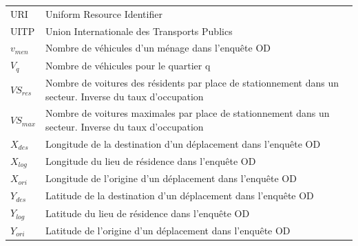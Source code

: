 \begin{longtable}{lp{5in}}
URI     & Uniform Resource Identifier                                                   \\
UITP     & Union Internationale des Transports Publics                                  \\
$v_{men}$ & Nombre de véhicules d'un ménage dans l'enquête OD                           \\
$V_q$ & Nombre de véhicules pour le quartier q\\
$VS_{res}$ & Nombre de voitures des résidents par place de stationnement dans un secteur. Inverse du taux d'occupation\\ 
$VS_{max}$ & Nombre de voitures maximales par place de stationnement dans un secteur. Inverse du taux d'occupation\\
$X_{des}$ & Longitude de la destination d'un déplacement dans l'enquête OD\\
$X_{log}$ & Longitude du lieu de résidence dans l'enquête OD\\
$X_{ori}$ & Longitude de l'origine d'un déplacement dans l'enquête OD \\
$Y_{des}$ & Latitude de la destination d'un déplacement dans l'enquête OD\\
$Y_{log}$ & Latitude du lieu de résidence dans l'enquête OD\\
$Y_{ori}$ & Latitude de l'origine d'un déplacement dans l'enquête OD\\
\end{longtable}

